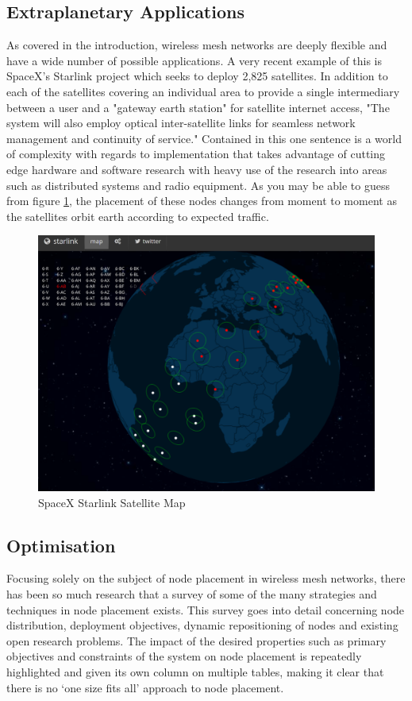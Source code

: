 	\subsection{Extraplanetary Applications}
		\label{sec:related_work_spacex} 
		As covered in the introduction, wireless mesh networks are deeply flexible and have a wide number of possible applications\cite{akyildiza47wireless}. A very recent example of this is SpaceX's Starlink project which seeks to deploy 2,825 satellites. In addition to each of the satellites covering an individual area to provide a single intermediary between a user and a "gateway earth station" for satellite internet access, "The system will also employ optical inter-satellite links for seamless network management and continuity of service\cite{fccspacextechnicala}." Contained in this one sentence is a world of complexity with regards to implementation that takes advantage of cutting edge hardware and software research with heavy use of the research into areas such as distributed systems and radio equipment. As you may be able to guess from figure \ref{fig:spacex}, the placement of these nodes changes from moment to moment as the satellites orbit earth according to expected traffic.
		\begin{figure}[H]
		\centering
		\includegraphics[scale=0.21]{graphics/spacex_map}
		\caption{SpaceX Starlink Satellite Map \cite{satellitemap}}
		\label{fig:spacex}
		\end{figure}
		
	\subsection{Optimisation}  
		\label{sec:related_work_optimisation} 
		Focusing solely on the subject of node placement in wireless mesh networks, there has been so much research that a survey of some of the many strategies and techniques in node placement exists\cite{younis2020placementsurvey}. This survey goes into detail concerning node distribution, deployment objectives, dynamic repositioning of nodes and existing open research problems. The impact of the desired properties such as primary objectives and constraints of the system on node placement is repeatedly highlighted and given its own column on multiple tables, making it clear that there is no `one size fits all' approach to node placement. 

